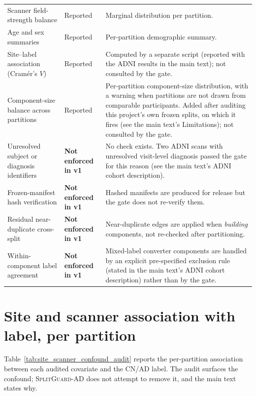 \documentclass[11pt]{article}
\newcommand{\SGA}{\textsc{SplitGuard-AD}}
\begin{document}
\begin{table}[!ht]
\begin{tabular}{>{\raggedright\arraybackslash}p{3.9cm}>{\raggedright\arraybackslash}p{2.1cm}>{\raggedright\arraybackslash}p{5.8cm}}
Scanner field-strength balance & Reported & Marginal distribution per partition. \\
Age and sex summaries & Reported & Per-partition demographic summary. \\
Site--label association (Cram\'{e}r's $V$) & Reported & Computed by a separate script (reported with the ADNI results in the main text); not consulted by the gate. \\
Component-size balance across partitions & Reported & Per-partition component-size distribution, with a warning when partitions are not drawn from comparable participants. Added after auditing this project's own frozen splits, on which it fires (see the main text's Limitations); not consulted by the gate. \\
\midrule
Unresolved subject or diagnosis identifiers & \textbf{Not enforced in v1} & No check exists. Two ADNI scans with unresolved visit-level diagnosis passed the gate for this reason (see the main text's ADNI cohort description). \\
Frozen-manifest hash verification & \textbf{Not enforced in v1} & Hashed manifests are produced for release but the gate does not re-verify them. \\
Residual near-duplicate cross-split & \textbf{Not enforced in v1} & Near-duplicate edges are applied when \emph{building} components, not re-checked after partitioning. \\
Within-component label agreement & \textbf{Not enforced in v1} & Mixed-label converter components are handled by an explicit pre-specified exclusion rule (stated in the main text's ADNI cohort description) rather than by the gate. \\
\bottomrule
\end{tabular}
\end{table}

\section{Site and scanner association with label, per partition}

Table~\ref{tab:site_scanner_confound_audit} reports the per-partition association between each audited covariate and the CN/AD label. The audit surfaces the confound; \SGA{} does not attempt to remove it, and the main text states why.
\end{document}
